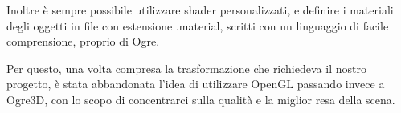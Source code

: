 Inoltre è sempre possibile utilizzare shader personalizzati, e definire i materiali degli oggetti in file con estensione .material, scritti con un linguaggio di facile comprensione, proprio di Ogre.

Per questo, una volta compresa la trasformazione che richiedeva il nostro progetto, è stata abbandonata l'idea di utilizzare OpenGL passando invece a Ogre3D, con lo scopo di concentrarci sulla qualità e la miglior resa della scena.
